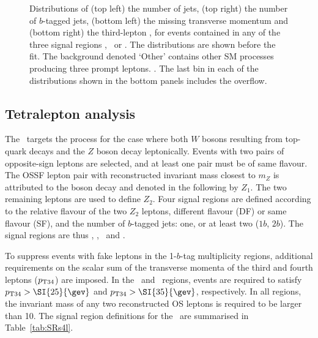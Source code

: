 \begin{figure}[htbp]
\caption{\label{fig:3l_sr} Distributions of (top left) the number of jets, (top
right) the number of $b$-tagged jets, (bottom left) the missing transverse
momentum and (bottom right) the third-lepton \pt, for events contained in any
of the three signal regions \TLSRA, \TLSRB\ or \TLSRC. The distributions are
shown before the fit.  The background denoted `Other' contains other SM
processes producing three prompt leptons.  \hatch. The last bin in each of the
distributions shown in the bottom panels includes the overflow.}
\end{figure}

\subsection{Tetralepton analysis}
\label{s:4L}

The \FLC\ targets the \ttZ process for the case where both $W$ bosons resulting
from top-quark decays and the $Z$ boson decay leptonically.  Events with two
pairs of opposite-sign leptons are selected, and at least one pair must be
of same flavour. The OSSF lepton pair with reconstructed invariant mass closest to
$m_Z$ is attributed to the \Zboson boson decay and denoted in the following by
$Z_1$.  The two remaining leptons are used to define $Z_2$.  Four signal
regions are defined according to the relative flavour of the two $Z_2$ leptons,
different flavour (DF) or same flavour (SF), and the number of $b$-tagged jets:
one, or at least two ($1b$, $2b$).  The signal regions are thus \FLSRB, \FLSRC,
\FLSRD\ and \FLSRE.

To suppress events with fake leptons in the 1-$b$-tag multiplicity regions, additional requirements on the scalar sum of the transverse momenta of the
third and fourth leptons ($p_{\text{T34}}$) are imposed.  In the \FLSRD\ and \FLSRB\
regions, events are required to satisfy $\pttf > \SI{25}{\gev}$ and $\pttf >
\SI{35}{\gev}$, respectively.  In all regions, the invariant mass of any two
reconstructed OS leptons is required to be larger than \SI{10}{\gev}. The signal region definitions for the \FLC\ are summarised in Table~\ref{tab:SRs4l}.

